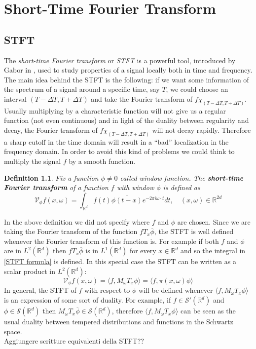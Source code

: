 \documentclass[corpo=11pt, stile=classica, tipotesi=custom,
greek, evenboxes, english]{toptesi}
\numberwithin{equation}{chapter}
\newtheorem{defi}[teo]{Definition}
\newcommand{\R}{\mathbb{R}} %
\newcommand{\V}{\mathcal{V}} %
\begin{document}

\chapter{Short-Time Fourier Transform}\label{chapter STFT}
\section{STFT}\label{section STFT}
{\color{red}The \emph{short-time Fourier transform} or \emph{STFT} is a powerful tool, introduced by Gabor in \cite{gabor}, used to study properties of a signal locally both in time and frequency. The main idea behind the STFT is the following: if we want some information of the spectrum of a signal around a specific time, say $T$, we could choose an interval $(T-\Delta T, T + \Delta T)$ and take the Fourier transform of $f \chi_{(T-\Delta T, T + \Delta T)}$. Usually multiplying by a characteristic function will not give us a regular function (not even continuous) and in light of the duality between regularity and decay, the Fourier transform of $f \chi_{(T-\Delta T, T + \Delta T)}$ will not decay rapidly. Therefore a sharp cutoff in the time domain will result in a ``bad'' localization in the frequency domain. In order to avoid this kind of problems we could think to multiply the signal $f$ by a smooth function.}
\begin{defi}\label{STFT def}
	Fix a function $\phi \neq 0$ called \emph{window function}. The \textbf{short-time Fourier transform} of a function $f$ with window $\phi$ is defined as
	\begin{equation}\label{STFT formula}
		\V_{\phi}f(x,\omega) = \int_{\R^d} f(t)\overline{\phi(t-x)}e^{-2 \pi i \omega \cdot t} dt, \quad (x,\omega) \in \R^{2d}
	\end{equation}
\end{defi}
In the above definition we did not specify where $f$ and $\phi$ are chosen. Since we are taking the Fourier transform of the function $f T_x\overline{\phi}$, the STFT is well defined whenever the Fourier transform of this function is. For example if both $f$ and $\phi$ are in $L^2(\R^d)$ then $f T_x\overline{\phi}$ is in $L^1(\R^d)$ for every $x \in \R^d$ and so the integral in \eqref{STFT formula} is defined. In this special case the STFT can be written as a scalar product in $L^2(\R^d)$:
\begin{equation*}
	\V_{\phi}f(x,\omega) = \langle f, M_{\omega} T_x \phi \rangle = \langle f, \pi(x,\omega) \phi \rangle
\end{equation*}
In general, the STFT of $f$ with respect to $\phi$ will be defined whenever  $\langle f, M_{\omega} T_x \phi \rangle$ is an expression of some sort of duality. For example, if $f \in \mathcal{S}'(\R^d)$ and $\phi \in \mathcal{S}(\R^d)$ then $M_{\omega} T_x \overline{\phi} \in \mathcal{S}(\R^d)$, therefore $\langle f, M_{\omega} T_x \phi \rangle$ can be seen as the usual duality between tempered distributions and functions in the Schwartz space.\\
{\color{blue} Aggiungere scritture equivalenti della STFT??}
\end{document}
